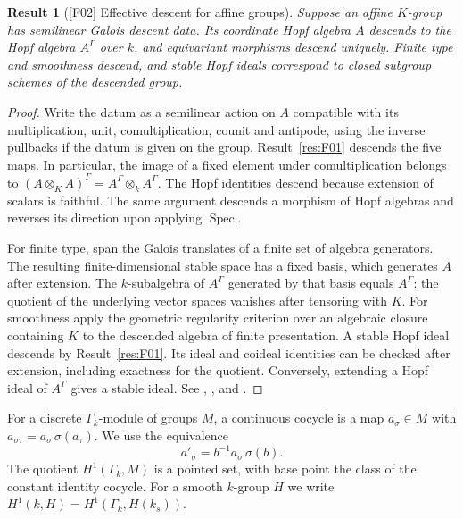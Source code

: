 \documentclass[11pt,a4paper,openany,oneside]{book}
\theoremstyle{resultstyle}
\newtheorem{statement}{Result}[chapter]
\newenvironment{result}[2]{\clubpenalty=10000\begin{statement}[\textnormal{[#1]} #2]\leavevmode\label{res:#1}\ignorespaces}{\end{statement}}
\theoremstyle{definition}
\numberwithin{equation}{chapter}
\DeclareMathOperator{\Spec}{Spec}
\begin{document}
\begin{result}{F02}{Effective descent for affine groups}
Suppose an affine $K$-group has semilinear Galois descent data. Its coordinate Hopf algebra $A$ descends to the Hopf algebra $A^\Gamma$ over $k$, and equivariant morphisms descend uniquely. Finite type and smoothness descend, and stable Hopf ideals correspond to closed subgroup schemes of the descended group.
\end{result}
\begin{proof}
Write the datum as a semilinear action on $A$ compatible with its multiplication, unit, comultiplication, counit and antipode, using the inverse pullbacks if the datum is given on the group. Result~\ref{res:F01} descends the five maps. In particular, the image of a fixed element under comultiplication belongs to $(A\otimes_K A)^\Gamma=A^\Gamma\otimes_k A^\Gamma$. The Hopf identities descend because extension of scalars is faithful. The same argument descends a morphism of Hopf algebras and reverses its direction upon applying $\Spec$.

For finite type, span the Galois translates of a finite set of algebra generators. The resulting finite-dimensional stable space has a fixed basis, which generates $A$ after extension. The $k$-subalgebra of $A^\Gamma$ generated by that basis equals $A^\Gamma$: the quotient of the underlying vector spaces vanishes after tensoring with $K$. For smoothness apply the geometric regularity criterion over an algebraic closure containing $K$ to the descended algebra of finite presentation. A stable Hopf ideal descends by Result~\ref{res:F01}. Its ideal and coideal identities can be checked after extension, including exactness for the quotient. Conversely, extending a Hopf ideal of $A^\Gamma$ gives a stable ideal. See \cite[Sec.~3.j]{milne}, \cite[Proposition 2.15]{prr}, and \cite[Tag 0CDQ]{stacks}.
\end{proof}

For a discrete $\Gamma_k$-module of groups $M$, a continuous cocycle is a map $a_\sigma\in M$ with $a_{\sigma\tau}=a_\sigma\,\sigma(a_\tau)$. We use the equivalence
\[
 a'_\sigma=b^{-1}a_\sigma\,\sigma(b).
\]
The quotient $H^1(\Gamma_k,M)$ is a pointed set, with base point the class of the constant identity cocycle. For a smooth $k$-group $H$ we write $H^1(k,H)=H^1(\Gamma_k,H(k_s))$.
\end{document}
